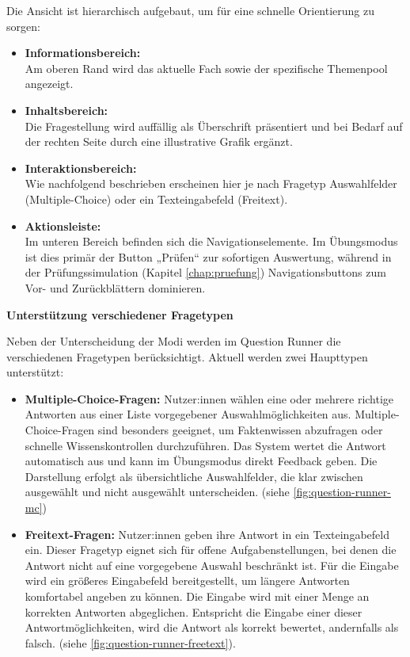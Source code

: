 Die Ansicht ist hierarchisch aufgebaut, um für eine schnelle Orientierung zu sorgen:
\begin{itemize}
	\item \textbf{Informationsbereich:} \\
	Am oberen Rand wird das aktuelle Fach sowie der spezifische Themenpool angezeigt.
	\item \textbf{Inhaltsbereich:} \\
	Die Fragestellung wird auffällig als Überschrift präsentiert und bei Bedarf auf der rechten Seite durch eine illustrative Grafik ergänzt.
	\item \textbf{Interaktionsbereich:} \\
	Wie nachfolgend beschrieben erscheinen hier je nach Fragetyp Auswahlfelder (Multiple-Choice) oder ein Texteingabefeld (Freitext).
	\item \textbf{Aktionsleiste:} \\
	Im unteren Bereich befinden sich die Navigationselemente. Im Übungsmodus ist dies primär der Button „Prüfen“ zur sofortigen Auswertung, während in der Prüfungssimulation (Kapitel \ref{chap:pruefung}) Navigationsbuttons zum Vor- und Zurückblättern dominieren.
\end{itemize}

\vspace{1cm}
\textbf{Unterstützung verschiedener Fragetypen}

Neben der Unterscheidung der Modi werden im Question Runner die verschiedenen Fragetypen berücksichtigt. Aktuell werden zwei Haupttypen unterstützt:

\begin{itemize}
	\item \textbf{Multiple-Choice-Fragen:} 
	Nutzer:innen wählen eine oder mehrere richtige Antworten aus einer Liste vorgegebener Auswahlmöglichkeiten aus. 
	Multiple-Choice-Fragen sind besonders geeignet, um Faktenwissen abzufragen oder schnelle Wissenskontrollen durchzuführen. 
	Das System wertet die Antwort automatisch aus und kann im Übungsmodus direkt Feedback geben. 
	Die Darstellung erfolgt als übersichtliche Auswahlfelder, die klar zwischen ausgewählt und nicht ausgewählt unterscheiden.
	(siehe \autoref{fig:question-runner-mc})
	
	\item \textbf{Freitext-Fragen:} 
	Nutzer:innen geben ihre Antwort in ein Texteingabefeld ein. 
	Dieser Fragetyp eignet sich für offene Aufgabenstellungen, bei denen die Antwort nicht auf eine vorgegebene Auswahl beschränkt ist. Für die Eingabe wird ein größeres Eingabefeld bereitgestellt, um längere Antworten komfortabel angeben zu können. Die Eingabe wird mit einer Menge an korrekten Antworten abgeglichen. Entspricht die Eingabe einer dieser Antwortmöglichkeiten, wird die Antwort als korrekt bewertet, andernfalls als falsch. 
	(siehe \autoref{fig:question-runner-freetext}).
\end{itemize}

